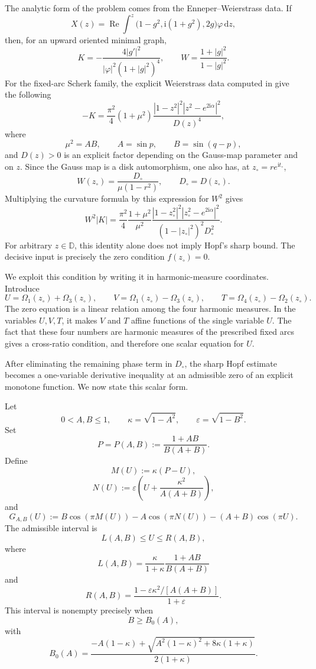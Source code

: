 \documentclass[11pt]{amsart}
\theoremstyle{remark}
\newcommand{\ii}{\mathrm i}
\newcommand{\dd}{\mathrm d}
\numberwithin{equation}{section}
\begin{document}
The analytic form of the problem comes from the Enneper--Weierstrass data.
If
\[
        X(z)=\operatorname{Re}\int^z
        \bigl(1-g^2,\ii(1+g^2),2g\bigr)\varphi\,\dd z,
\]
then, for an upward oriented minimal graph,
\[
        K=-\frac{4|g'|^2}{|\varphi|^2(1+|g|^2)^4},
        \qquad
        W=\frac{1+|g|^2}{1-|g|^2}.
\]
For the fixed-arc Scherk family, the explicit Weierstrass data computed in
\cite{KalajMelentijevic2026} give the following
\[
        -K
        =
        \frac{\pi^2}{4}(1+\mu^2)
        \frac{|1-z^2|^2|z^2-e^{2\ii\alpha}|^2}{D(z)^4},
\]
where
\[
        \mu^2=AB,\qquad A=\sin p,\qquad B=\sin(q-p),
\]
and \(D(z)>0\) is an explicit factor depending on the Gauss-map parameter
and on \(z\).  Since the Gauss map is a disk automorphism, one also has, at
\(z_\circ=re^{\ii t_\circ}\),
\[
        W(z_\circ)=\frac{D_\circ}{\mu(1-r^2)},
        \qquad
        D_\circ=D(z_\circ).
\]
Multiplying the curvature formula by this expression for \(W^2\) gives
\[
        W^2|K|
        =
        \frac{\pi^2}{4}\frac{1+\mu^2}{\mu^2}
        \frac{|1-z_\circ^2|^2|z_\circ^2-e^{2\ii\alpha}|^2}
        {(1-|z_\circ|^2)^2D_\circ^2}.
\]
For arbitrary \(z\in\mathbb D\), this identity alone does not imply Hopf's
sharp bound.  The decisive input is precisely the zero condition
\(f(z_\circ)=0\).

We exploit this condition by writing it in harmonic-measure coordinates.
Introduce
\[
        U=\Omega_1(z_\circ)+\Omega_3(z_\circ),
        \qquad
        V=\Omega_1(z_\circ)-\Omega_3(z_\circ),
        \qquad
        T=\Omega_4(z_\circ)-\Omega_2(z_\circ).
\]
The zero equation is a linear relation among the four harmonic measures.  In
the variables \(U,V,T\), it makes \(V\) and \(T\) affine functions of the
single variable \(U\).  The fact that these four numbers are harmonic
measures of the prescribed fixed arcs gives a cross-ratio condition, and
therefore one scalar equation for \(U\).

After eliminating the remaining phase term in \(D_\circ\), the sharp Hopf
estimate becomes a one-variable derivative inequality at an admissible zero
of an explicit monotone function.  We now state this scalar form.

Let
\[
        0<A,B\leq 1,
        \qquad
        \kappa=\sqrt{1-A^2},
        \qquad
        \varepsilon=\sqrt{1-B^2}.
\]
Set
\[
        P=P(A,B):=\frac{1+AB}{B(A+B)}.
\]
Define
\[
        M(U):=\kappa(P-U),
\]
\[
        N(U):=\varepsilon\left(U+\frac{\kappa^2}{A(A+B)}\right),
\]
and
\[
        G_{A,B}(U)
        :=
        B\cos(\pi M(U))
        -A\cos(\pi N(U))
        -(A+B)\cos(\pi U).
\]
The admissible interval is
\[
        L(A,B)\leq U\leq R(A,B),
\]
where
\[
        L(A,B)=
        \frac{\kappa}{1+\kappa}\frac{1+AB}{B(A+B)}
\]
and
\[
        R(A,B)=
        \frac{1-\varepsilon\kappa^2/[A(A+B)]}{1+\varepsilon}.
\]
This interval is nonempty precisely when
\[
        B\geq B_0(A),
\]
with
\[
        B_0(A)=
        \frac{-A(1-\kappa)+
        \sqrt{A^2(1-\kappa)^2+8\kappa(1+\kappa)}}
        {2(1+\kappa)}.
\]
\end{document}
